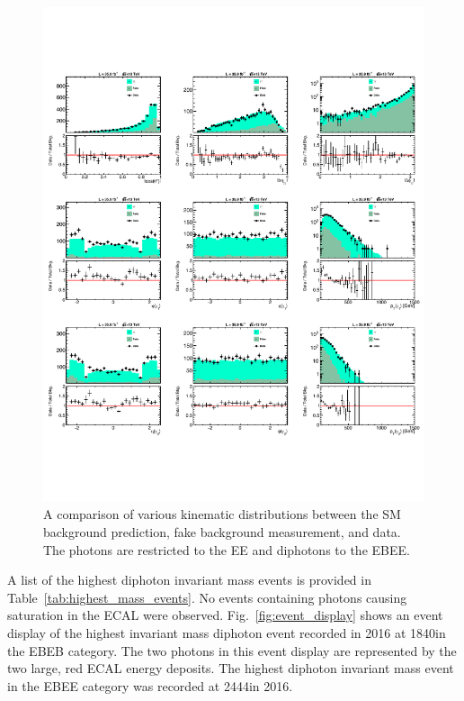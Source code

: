 \begin{figure}[!htbp]
	\centering
	\includegraphics[width=1.0\textwidth]{figures/kinematicSummary_EBEE_merged.pdf}
	\caption{A comparison of various kinematic distributions between the SM background prediction, fake background measurement, and data. The photons are restricted to the EE and diphotons to the EBEE.}
	\label{fig:kinematics_EBEE}
\end{figure}


A list of the highest diphoton invariant mass \mgg events is provided in Table~\ref{tab:highest_mass_events}. No events containing photons causing saturation in the ECAL were observed. Fig.~\ref{fig:event_display} shows an event display of the highest invariant mass diphoton event recorded in 2016 at 1840\GeV in the EBEB category. The two photons in this event display are represented by the two large, red ECAL energy deposits. The highest diphoton invariant mass event in the EBEE category was recorded at 2444\GeV in 2016.


